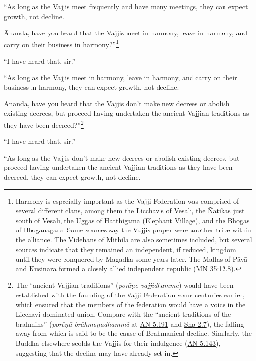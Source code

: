 \documentclass[12pt,openany]{book}%
\begin{document}
“As long as the Vajjis meet frequently and have many meetings, they can expect growth, not decline. 

Ānanda, have you heard that the Vajjis meet in harmony, leave in harmony, and carry on their business in harmony?”\footnote{Harmony is especially important as the Vajji Federation was comprised of several different clans, among them the Licchavis of \textsanskrit{Vesālī}, the \textsanskrit{Ñātikas} just south of \textsanskrit{Vesālī}, the Uggas of \textsanskrit{Hatthigāma} (Elephant Village), and the Bhogas of Bhoganagara. Some sources say the Vajjis proper were another tribe within the alliance. The Videhans of \textsanskrit{Mithilā} are also sometimes included, but several sources indicate that they remained an independent, if reduced, kingdom until they were conquered by Magadha some years later. The Mallas of \textsanskrit{Pāvā} and \textsanskrit{Kusinārā} formed a closely allied independent republic (\href{https://suttacentral.net/mn35/en/sujato\#12.8}{MN 35:12.8}). } 

“I have heard that, sir.” 

“As long as the Vajjis meet in harmony, leave in harmony, and carry on their business in harmony, they can expect growth, not decline. 

Ānanda, have you heard that the Vajjis don’t make new decrees or abolish existing decrees, but proceed having undertaken the ancient Vajjian traditions as they have been decreed?”\footnote{The “ancient Vajjian traditions” (\textit{\textsanskrit{porāṇe} vajjidhamme}) would have been established with the founding of the Vajji Federation some centuries earlier, which ensured that the members of the federation would have a voice in the Licchavi-dominated union. Compare with the “ancient traditions of the brahmins” (\textit{\textsanskrit{porāṇā} \textsanskrit{brāhmaṇadhammā}} at \href{https://suttacentral.net/an5.191/en/sujato}{AN 5.191} and \href{https://suttacentral.net/snp2.7/en/sujato}{Snp 2.7}), the falling away from which is said to be the cause of Brahmanical decline. Similarly, the Buddha elsewhere scolds the Vajjis for their indulgence (\href{https://suttacentral.net/an5.143/en/sujato}{AN 5.143}), suggesting that the decline may have already set in. } 

“I have heard that, sir.” 

“As long as the Vajjis don’t make new decrees or abolish existing decrees, but proceed having undertaken the ancient Vajjian traditions as they have been decreed, they can expect growth, not decline. 
\end{document}
